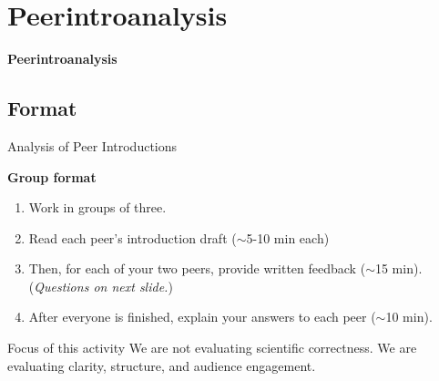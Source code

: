 \documentclass{beamer}
\begin{document}

\section{Peerintroanalysis}

\begin{frame}
  \centering
  \vfill
  {\Large\bfseries Peerintroanalysis}
  \vfill
\end{frame}




\subsection{Format}
\begin{frame}{Analysis of Peer Introductions}

  \textbf{Group format}
  \begin{enumerate}
    \item Work in groups of three.
    \item Read each peer's introduction draft ($\sim$5-10 min each)
    \item Then, for each of your two peers, provide written feedback ($\sim$15 min). (\textit{Questions on next slide.})
    \item After everyone is finished, explain your answers to each peer ($\sim$10 min).
  \end{enumerate}

    \begin{block}{Focus of this activity}
    We are not evaluating scientific correctness.
    We are evaluating clarity, structure, and audience engagement.
  \end{block}

\end{frame}

\end{document}
